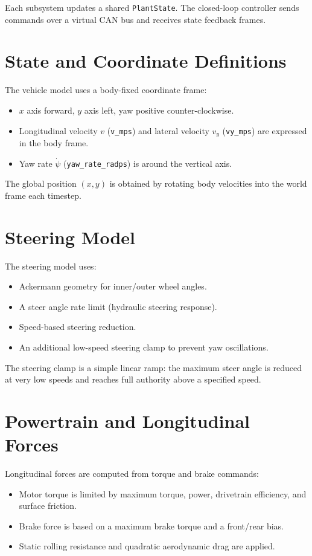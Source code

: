 \documentclass[11pt]{article}
\begin{document}
Each subsystem updates a shared \texttt{PlantState}. The closed-loop controller sends commands over a virtual CAN bus and receives state feedback frames.

\section{State and Coordinate Definitions}
The vehicle model uses a body-fixed coordinate frame:

\begin{itemize}
\item $x$ axis forward, $y$ axis left, yaw positive counter-clockwise.
\item Longitudinal velocity $v$ (\texttt{v\_mps}) and lateral velocity $v_y$ (\texttt{vy\_mps}) are expressed in the body frame.
\item Yaw rate $\dot{\psi}$ (\texttt{yaw\_rate\_radps}) is around the vertical axis.
\end{itemize}

The global position $(x, y)$ is obtained by rotating body velocities into the world frame each timestep.

\section{Steering Model}
The steering model uses:

\begin{itemize}
\item Ackermann geometry for inner/outer wheel angles.
\item A steer angle rate limit (hydraulic steering response).
\item Speed-based steering reduction.
\item An additional low-speed steering clamp to prevent yaw oscillations.
\end{itemize}

The steering clamp is a simple linear ramp: the maximum steer angle is reduced at very low speeds and reaches full authority above a specified speed.

\section{Powertrain and Longitudinal Forces}
Longitudinal forces are computed from torque and brake commands:

\begin{itemize}
\item Motor torque is limited by maximum torque, power, drivetrain efficiency, and surface friction.
\item Brake force is based on a maximum brake torque and a front/rear bias.
\item Static rolling resistance and quadratic aerodynamic drag are applied.
\end{itemize}
\end{document}
